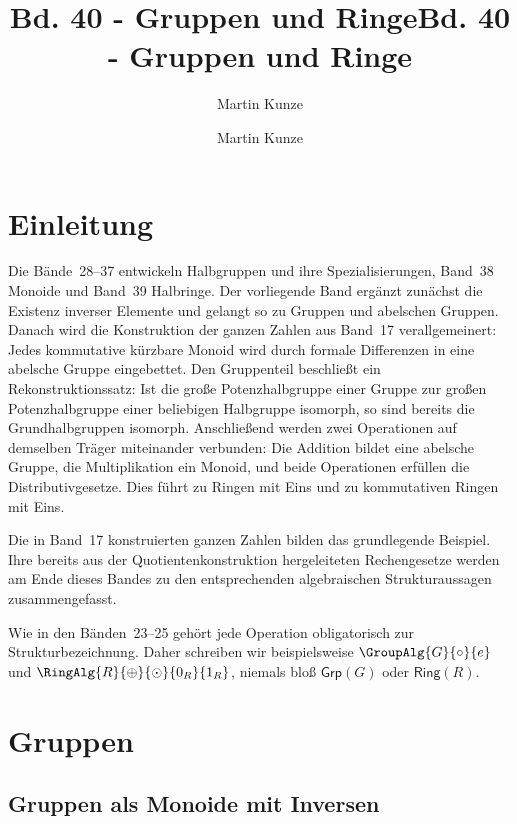 \documentclass[main.tex]{subfiles}
\title{Bd. 40 - Gruppen und Ringe}
\author{Martin Kunze}
\date{}
\begin{document}
\newcommand{\BandXXIXProofRefStack}[1]{%
  \ensuremath{\begin{gathered}#1\end{gathered}}}

\title{Bd. 40 - Gruppen und Ringe}
\author{Martin Kunze}
\date{}
\hypersetup{pageanchor=false}
\maketitle
\hypersetup{pageanchor=true}
\setcounter{tocdepth}{3}
\tableofcontents
\setcounter{file}{40}
\renewcommand{\FormulaBandID}{40}

\chapter{Einleitung}

Die Bände~28--37 entwickeln Halbgruppen und ihre Spezialisierungen,
Band~38 Monoide und Band~39 Halbringe.
Der vorliegende Band ergänzt zunächst die Existenz inverser Elemente und
gelangt so zu Gruppen und abelschen Gruppen. Danach wird die Konstruktion
der ganzen Zahlen aus Band~17 verallgemeinert: Jedes kommutative kürzbare
Monoid wird durch formale Differenzen in eine abelsche Gruppe eingebettet.
Den Gruppenteil beschließt ein Rekonstruktionssatz: Ist die große
Potenzhalbgruppe einer Gruppe zur großen Potenzhalbgruppe einer beliebigen
Halbgruppe isomorph, so sind bereits die Grundhalbgruppen isomorph.
Anschließend werden zwei Operationen auf demselben Träger miteinander
verbunden: Die Addition bildet eine abelsche Gruppe, die Multiplikation ein
Monoid, und beide Operationen erfüllen die Distributivgesetze. Dies führt zu
Ringen mit Eins und zu kommutativen Ringen mit Eins.

Die in Band~17 konstruierten ganzen Zahlen bilden das grundlegende Beispiel.
Ihre bereits aus der Quotientenkonstruktion hergeleiteten Rechengesetze
werden am Ende dieses Bandes zu den entsprechenden algebraischen
Strukturaussagen zusammengefasst.

Wie in den Bänden~23--25 gehört jede Operation obligatorisch zur
Strukturbezeichnung. Daher schreiben wir beispielsweise
\(\GroupAlg{G}{\circ}{e}\) und
\(\RingAlg{R}{\oplus}{\odot}{0_R}{1_R}\), niemals bloß
\(\mathsf{Grp}(G)\) oder \(\mathsf{Ring}(R)\).

\chapter{Gruppen}

\section{Gruppen als Monoide mit Inversen}
\end{document}
